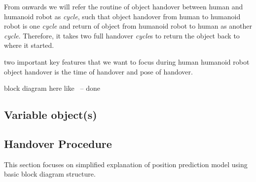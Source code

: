 \documentclass[a4paper, 12pt, oneside]{Thesis}  %
\begin{document}
From onwards we will refer the routine of object handover between human and humanoid robot as \textit{cycle}, such that object handover from human to humanoid robot is one \textit{cycle} and return of object from humanoid robot to human as another \textit {cycle}. Therefore, it takes two full handover \textit{cycle}s to return the object back to where it started.

two important key features that we want to focus during human humanoid robot object handover is the time of handover and pose of handover.

block diagram here like~\cite{li2015predicting} -- done


\subsection{Variable object(s)}


\subsection{Handover Procedure}\label{fig:Pred_blockDiag}
This section focuses on simplified explanation of position prediction model using basic block diagram structure.
\end{document}
